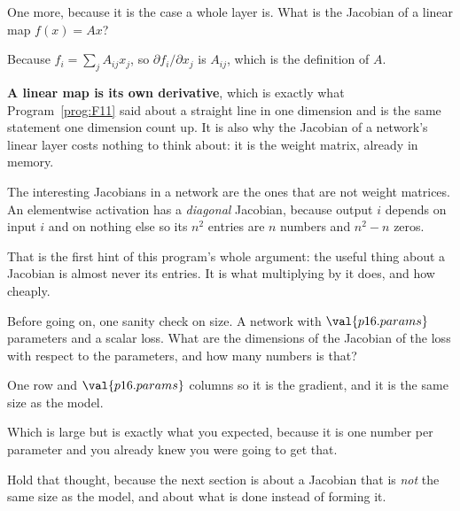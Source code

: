 \begin{fr}
One more, because it is the case a whole layer is. What is the Jacobian of a
linear map $f(x) = Ax$?
\dotline
\nextframe
\end{fr}

\begin{fr}
Because $f_i = \sum_j A_{ij} x_j$, so $\partial f_i / \partial x_j$ is
$A_{ij}$, which is the definition of $A$.

\textbf{A linear map is its own derivative}, which is exactly what
Program~\ref{prog:F11} said about a straight line in one dimension and is the
same statement one dimension count up. It is also why the Jacobian of a
network's linear layer costs nothing to think about: it is the weight matrix,
already in memory.

\begin{aibox}
The interesting Jacobians in a network are the ones that are not weight
matrices. An elementwise activation has a \emph{diagonal} Jacobian, because
output $i$ depends on input $i$ and on nothing else \dash{} so its $n^{2}$
entries are $n$ numbers and $n^{2} - n$ zeros.

That is the first hint of this program's whole argument: the useful thing
about a Jacobian is almost never its entries. It is what multiplying by it
does, and how cheaply.
\end{aibox}
\end{fr}

\begin{fr}
Before going on, one sanity check on size. A network with
$\val{p16.params}$ parameters and a scalar loss. What are the dimensions of
the Jacobian of the loss with respect to the parameters, and how many numbers
is that?
\nextframe
\end{fr}

\begin{fr}
\begin{ansblock}
One row and $\val{p16.params}$ columns \dash{} so it is the gradient, and it
is the same size as the model.
\end{ansblock}

Which is large but is exactly what you expected, because it is one number per
parameter and you already knew you were going to get that.

Hold that thought, because the next section is about a Jacobian that is
\emph{not} the same size as the model, and about what is done instead of
forming it.
\end{fr}

